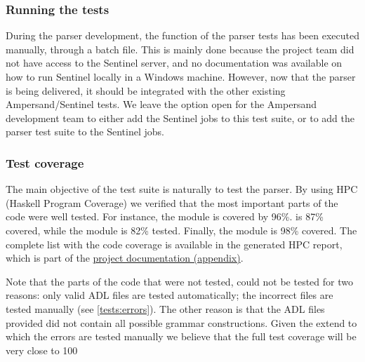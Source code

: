   \subsubsection{Running the tests}
  During the parser development, the  function of the parser tests has been executed manually, through a batch file.
  This is mainly done because the project team did not have access to the Sentinel server, and no documentation was available on how to run Sentinel locally in a Windows machine.
  However, now that the parser is being delivered, it should be integrated with the other existing Ampersand/Sentinel tests.
  We leave the option open for the Ampersand development team to either add the Sentinel jobs to this test suite, or to add the parser test suite to the Sentinel jobs.
  
  \subsubsection{Test coverage}
  The main objective of the test suite is naturally to test the parser.
  By using HPC (Haskell Program Coverage) we verified that the most important parts of the code were well tested.
  For instance, the  module is covered by 96\%.
   is 87\% covered, while the module  is 82\% tested.
  Finally, the module  is 98\% covered.
  The complete list with the code coverage is available in the generated HPC report, which is part of the \hyperref[app:docs]{project documentation (appendix)}.
  
  Note that the parts of the code that were not tested, could not be tested for two reasons: only valid ADL files are tested automatically; the incorrect files are tested manually (see \autoref{tests:errors}).
  The other reason is that the ADL files provided did not contain all possible grammar constructions.
  Given the extend to which the errors are tested manually we believe that the full test coverage will be very close to 100%
  